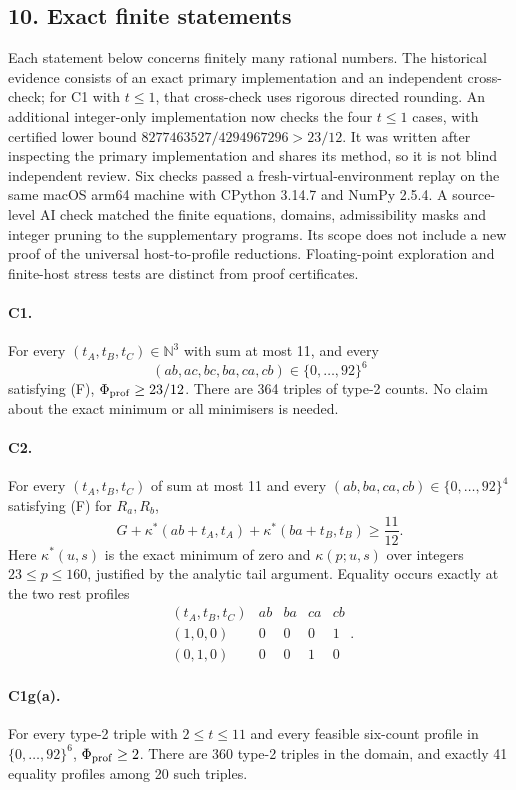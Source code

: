 \subsection*{10. Exact finite statements}
Each statement below concerns finitely many rational numbers. The historical evidence consists of an exact primary implementation and an independent cross-check; for C1 with $t\leq1$, that cross-check uses rigorous directed rounding. An additional integer-only implementation now checks the four $t\leq1$ cases, with certified lower bound $8277463527/4294967296>23/12$. It was written after inspecting the primary implementation and shares its method, so it is not blind independent review. Six checks passed a fresh-virtual-environment replay on the same macOS arm64 machine with CPython 3.14.7 and NumPy 2.5.4. A source-level AI check matched the finite equations, domains, admissibility masks and integer pruning to the supplementary programs. Its scope does not include a new proof of the universal host-to-profile reductions. Floating-point exploration and finite-host stress tests are distinct from proof certificates.
\paragraph{C1.} For every $(t_A,t_B,t_C)\in\mathbb N^3$ with sum at most 11, and every
\[
 (ab,ac,bc,ba,ca,cb)\in\{0,\ldots,92\}^6
\]
satisfying (F), $\Phi_{\rm prof}\geq23/12$. There are 364 triples of type-2 counts. No claim about the exact minimum or all minimisers is needed.
\paragraph{C2.} For every $(t_A,t_B,t_C)$ of sum at most 11 and every $(ab,ba,ca,cb)\in\{0,\ldots,92\}^4$ satisfying (F) for $R_a,R_b$,
\[
 G+\kappa^*(ab+t_A,t_A)+\kappa^*(ba+t_B,t_B)\geq\frac{11}{12}.
\]
Here $\kappa^*(u,s)$ is the exact minimum of zero and $\kappa(p;u,s)$ over integers $23\leq p\leq160$, justified by the analytic tail argument. Equality occurs exactly at the two rest profiles
\[
 \begin{array}{c|rrrr}
 (t_A,t_B,t_C)&ab&ba&ca&cb\\\hline
 (1,0,0)&0&0&0&1\\
 (0,1,0)&0&0&1&0
 \end{array}.
\]
\paragraph{C1g(a).} For every type-2 triple with $2\leq t\leq11$ and every feasible six-count profile in $\{0,\ldots,92\}^6$, $\Phi_{\rm prof}\geq2$. There are 360 type-2 triples in the domain, and exactly 41 equality profiles among 20 such triples.
